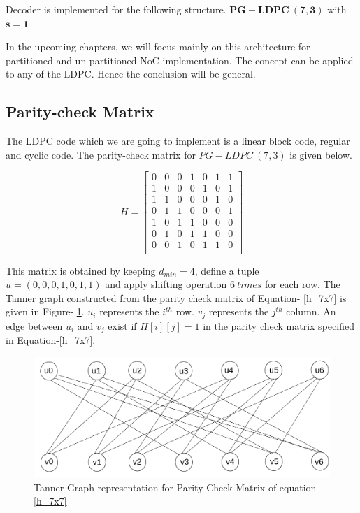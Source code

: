Decoder is implemented for the following structure.
$\mathbf{PG-LDPC\ (7,3)}$ with $\mathbf{s=1}$

In the upcoming chapters, we will focus mainly on this architecture for partitioned and un-partitioned NoC implementation. The concept can be applied to any of the LDPC. Hence the conclusion will be general.  

\subsection{Parity-check Matrix}
The LDPC code which we are going to implement is a linear block code, regular and cyclic code.
The parity-check matrix for $PG-LDPC\ (7,3)$ is given below.

\begin {equation} \label{h_7x7}
H=
\begin{bmatrix} 
0 & 0 & 0 & 1 & 0 & 1 & 1 \\
1 & 0 & 0 & 0 & 1 & 0 & 1 \\
1 & 1 & 0 & 0 & 0 & 1 & 0 \\
0 & 1 & 1 & 0 & 0 & 0 & 1 \\
1 & 0 & 1 & 1 & 0 & 0 & 0 \\
0 & 1 & 0 & 1 & 1 & 0 & 0 \\
0 & 0 & 1 & 0 & 1 & 1 & 0 \\ 
\end{bmatrix}
\end {equation}

This matrix is obtained by keeping $d_{min}=4$, define a tuple $u= (0,0,0,1,0,1,1)$ and 
apply shifting operation $6\ times$ for each row.
The Tanner graph constructed from the parity check matrix of Equation- \ref{h_7x7} is given in 
Figure- \ref{tanner_graph_for_parity_check}.
$u_{i}$ represents the $i^{th}$ row. $v_{j}$ represents the $j^{th}$ column.
An edge between $u_{i}$ and $v_{j}$ exist if $H [i][j]=1$ in the parity check matrix specified in Equation-\ref{h_7x7}.


\begin{figure}[H]
  \centering
   \includegraphics[scale=0.3]{./figs/tanner_graph_for_parity_check}
  \caption{Tanner Graph representation for Parity Check Matrix of equation \ref{h_7x7}}
  \label{tanner_graph_for_parity_check}
\end{figure}


